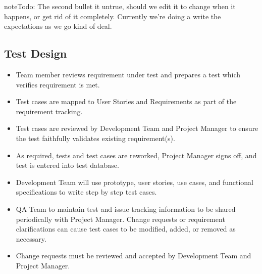 \documentclass[letterpaper,10pt,english]{sphinxmanual}
\begin{document}
\begin{sphinxadmonition}{note}{\label{test_plan/test_management:index-0}Todo:}
The second bullet it untrue, should we edit it to change when it happens, or get rid of it completely. Currently we’re doing a write the expectations as we go kind of deal.
\end{sphinxadmonition}


\subsection{Test Design}
\label{\detokenize{test_plan/test_management:test-design}}\begin{itemize}
\item {} 
Team member reviews requirement under test and prepares a test which verifies requirement is met.

\item {} 
Test cases are mapped to User Stories and Requirements as part of the requirement tracking.

\item {} 
Test cases are reviewed by Development Team and Project Manager to ensure the test faithfully validates existing requirement(s).

\item {} 
As required, tests and test cases are reworked, Project Manager signs off, and test is entered into test database.

\item {} 
Development Team will use prototype, user stories, use cases, and functional specifications to write step by step test cases.

\item {} 
QA Team to maintain test and issue tracking information to be shared periodically with Project Manager. Change requests or requirement clarifications can cause test cases to be modified, added, or removed as necessary.

\item {} 
Change requests must be reviewed and accepted by Development Team and Project Manager.

\end{itemize}
\end{document}
